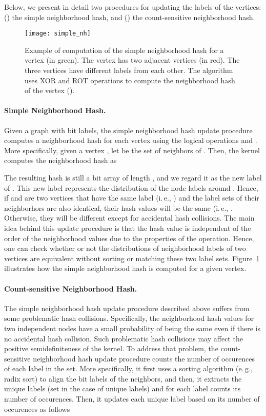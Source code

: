 \documentclass[twoside,11pt]{article}
\newcommand{\eg}{e.\,g., }
\newcommand{\ie}{i.\,e., }
\begin{document}
Below, we present in detail two procedures for updating the labels of the vertices: () the simple neighborhood hash, and () the count-sensitive neighborhood hash.

\begin{figure}[t]
  \centering
  \texttt{[image: simple\_nh]}
  \caption{Example of computation of the simple neighborhood hash for a vertex (in green). The vertex has two adjacent vertices (in red). The three vertices have different labels from each other. The algorithm uses XOR and ROT operations to compute the neighborhood hash of the vertex ().}
  \label{fig:simple_nh}
\end{figure}

\paragraph{Simple Neighborhood Hash.}
Given a graph  with bit labels, the simple neighborhood hash update procedure computes a neighborhood hash for each vertex using the logical operations  and .
More specifically, given a vertex , let  be the set of neighbors of .
Then, the kernel computes the neighborhood hash as

The resulting hash  is still a bit array of length , and we regard it as the new label of .
This new label represents the distribution of the node labels around .
Hence, if  and  are two vertices that have the same label (\ie ) and the label sets of their neighborhors are also identical, their hash values will be the same (\ie .
Otherwise, they will be different except for accidental hash collisions.
The main idea behind this update procedure is that the hash value is independent of the order of the neighborhood values due to the properties of the  operation.
Hence, one can check whether or not the distributions of neighborhood labels of two vertices are equivalent without sorting or matching these two label sets.
Figure~\ref{fig:simple_nh} illustrates how the simple neighborhood hash is computed for a given vertex.

\paragraph{Count-sensitive Neighborhood Hash.}
The simple neighborhood hash update procedure described above suffers from some problematic hash collisions.
Specifically, the neighborhood hash values for two independent nodes have a small probability of being the same even if there is no accidental hash collision.
Such problematic hash collisions may affect the positive semidefiniteness of the kernel.
To address that problem, the count-sensitive neighborhood hash update procedure counts the number of occurences of each label in the set.
More specifically, it first uses a sorting algorithm (\eg radix sort) to align the bit labels of the neighbors, and then, it extracts the unique labels (set  in the case of  unique labels) and for each label counts its number of occurences.
Then, it updates each unique label based on its number of occurences as follows
\end{document}
